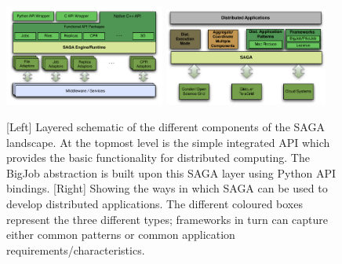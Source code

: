 \documentclass{rspublic}
\begin{document}
\begin{figure}[!ht]
 \begin{center}
     \includegraphics[width=0.47\textwidth]{stci_saga_figures-1}
    \includegraphics[width=0.48\textwidth]{distributed_applications_saga_figure}
\end{center}
\caption{\small [Left] Layered schematic of the different components
  of the SAGA landscape. At the topmost level is the simple integrated
  API which provides the basic functionality for distributed
  computing. The BigJob abstraction is built upon this SAGA layer
  using Python API bindings. [Right] Showing the ways in which SAGA
  can be used to develop distributed applications. The different
  coloured boxes represent the three different types; frameworks in turn
  can capture either common patterns or common application
  requirements/characteristics.} \label{Fig:SAGA1}
\end{figure}
\end{document}
